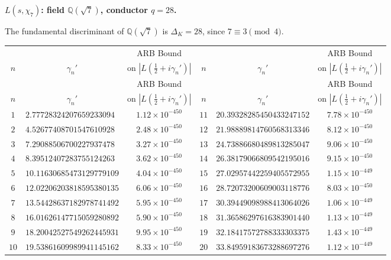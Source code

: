 \documentclass[12pt,reqno]{amsart}
\theoremstyle{plain}
\theoremstyle{definition}
\theoremstyle{remark}
\newcommand{\Q}{\mathbb{Q}}
\begin{document}
\medskip\noindent\textbf{$L(s,\chi_7)$: field $\Q(\sqrt{7})$, conductor $q=28$.}\par\smallskip
\label{app:chi28-zeros}

The fundamental discriminant of $\Q(\sqrt{7})$ is $\Delta_K = 28$, since $7 \equiv 3 \pmod{4}$.

\renewcommand{\arraystretch}{1.05}\footnotesize
\begin{longtable}{clc|clc}
\toprule
 & & \multicolumn{1}{c}{ARB Bound} &
 & & \multicolumn{1}{c}{ARB Bound} \\
$n$ & \multicolumn{1}{c}{$\gamma_n'$} & \multicolumn{1}{c}{on $|L(\tfrac{1}{2}+i\gamma_n')|$} &
$n$ & \multicolumn{1}{c}{$\gamma_n'$} & \multicolumn{1}{c}{on $|L(\tfrac{1}{2}+i\gamma_n')|$} \\
\midrule
\endfirsthead
\toprule
 & & \multicolumn{1}{c}{ARB Bound} &
 & & \multicolumn{1}{c}{ARB Bound} \\
$n$ & \multicolumn{1}{c}{$\gamma_n'$} & \multicolumn{1}{c}{on $|L(\tfrac{1}{2}+i\gamma_n')|$} &
$n$ & \multicolumn{1}{c}{$\gamma_n'$} & \multicolumn{1}{c}{on $|L(\tfrac{1}{2}+i\gamma_n')|$} \\
\midrule
\endhead
\bottomrule
\endlastfoot
$1$ & $2.77728324207659233094$ & $1.12 \times 10^{-450}$ & $11$ & $20.39328285450433247152$ & $7.78 \times 10^{-450}$ \\
$2$ & $4.52677408701547610928$ & $2.48 \times 10^{-450}$ & $12$ & $21.98889814760568313346$ & $8.12 \times 10^{-450}$ \\
$3$ & $7.29088506700227937478$ & $3.27 \times 10^{-450}$ & $13$ & $24.73886680489813285047$ & $9.06 \times 10^{-450}$ \\
$4$ & $8.39512407283755124263$ & $3.62 \times 10^{-450}$ & $14$ & $26.38179066809542195016$ & $9.15 \times 10^{-450}$ \\
$5$ & $10.11630685473129779109$ & $4.04 \times 10^{-450}$ & $15$ & $27.02957442259405572955$ & $1.15 \times 10^{-449}$ \\
$6$ & $12.02206203818595380135$ & $6.06 \times 10^{-450}$ & $16$ & $28.72073200609003118776$ & $8.03 \times 10^{-450}$ \\
$7$ & $13.54428637182978741492$ & $5.95 \times 10^{-450}$ & $17$ & $30.39449098988413064026$ & $1.06 \times 10^{-449}$ \\
$8$ & $16.01626147715059280892$ & $5.90 \times 10^{-450}$ & $18$ & $31.36586297616383901440$ & $1.13 \times 10^{-449}$ \\
$9$ & $18.20042527549262445931$ & $9.95 \times 10^{-450}$ & $19$ & $32.18417572788333303375$ & $1.43 \times 10^{-449}$ \\
$10$ & $19.53861609989941145162$ & $8.33 \times 10^{-450}$ & $20$ & $33.84959183673288697276$ & $1.12 \times 10^{-449}$ \\

\end{longtable}
\normalsize
\end{document}
